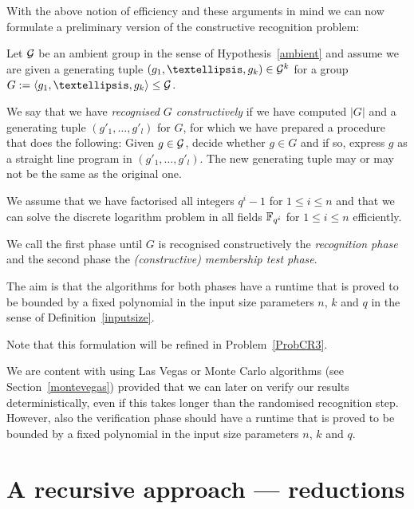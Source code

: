 With the above notion of efficiency and these arguments in mind we can now 
formulate a preliminary version of the constructive recognition problem:

\begin{Problem}
\label{ProbCR2}
Let $\mathcal{G}$ be an ambient group in the sense of Hypothesis~\ref{ambient} and 
assume we are given a generating tuple $(g_1, \ldots, g_k) \in
\GG^k$ for a group $G := \left< g_1, \ldots, g_k \right> \le \GG$. 

We say that we have \emph{recognised $G$ constructively} if we have 
computed $|G|$ and a
generating tuple $( g'_1, \ldots, g'_l )$ for $G$, for which we have
prepared a procedure that does the following: Given $g \in \mathcal{G}$,
decide whether $g \in G$ and if so, express $g$ as a straight line program
in $(g'_1, \ldots, g'_l)$. The new generating tuple may or may not be the
same as the original one.

We assume that we have factorised all integers $q^i-1$ for $1 \le i \le n$
and that we can solve the discrete logarithm problem in all fields
$\mathbb{F}_{q^i}$ for $1 \le i \le n$ efficiently. 

We call the first phase until $G$ is
recognised constructively the \emph{recognition phase} and the second
phase the \emph{(constructive) membership test phase}.

The aim is that the algorithms for both phases have a runtime that is proved
to be bounded by a fixed polynomial in the input size parameters $n$, $k$
and $q$ in the sense of Definition~\ref{inputsize}.
\proofend
\end{Problem}

Note that this formulation will be refined in Problem~\ref{ProbCR3}.

\begin{Rem}
We are content with using Las Vegas or Monte Carlo algorithms (see
Section~\ref{montevegas}) provided that we can later on verify our results
deterministically, even if this takes longer than the randomised
recognition step. However, also the verification phase should have a
runtime that is proved to be bounded by a fixed polynomial in the input
size parameters $n$, $k$ and $q$.
\end{Rem}

\section{A recursive approach --- reductions}
\label{recapproach}

